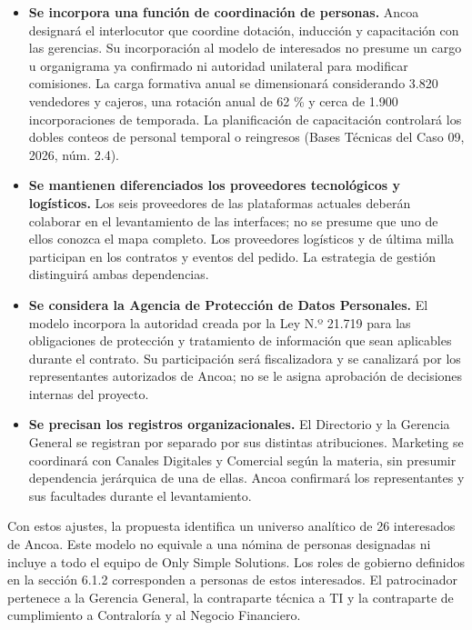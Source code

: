 \documentclass[11pt]{article}
\begin{document}
\begin{itemize}
\item
  \textbf{Se incorpora una función de coordinación de personas.} Ancoa
  designará el interlocutor que coordine dotación, inducción y
  capacitación con las gerencias. Su incorporación al modelo de
  interesados no presume un cargo u organigrama ya confirmado ni
  autoridad unilateral para modificar comisiones. La carga formativa
  anual se dimensionará considerando 3.820 vendedores y cajeros, una
  rotación anual de 62 \% y cerca de 1.900 incorporaciones de temporada.
  La planificación de capacitación controlará los dobles conteos de
  personal temporal o reingresos (Bases Técnicas del Caso 09, 2026,
  núm. 2.4).
\item
  \textbf{Se mantienen diferenciados los proveedores tecnológicos y
  logísticos.} Los seis proveedores de las plataformas actuales deberán
  colaborar en el levantamiento de las interfaces; no se presume que uno
  de ellos conozca el mapa completo. Los proveedores logísticos y de
  última milla participan en los contratos y eventos del pedido. La
  estrategia de gestión distinguirá ambas dependencias.
\item
  \textbf{Se considera la Agencia de Protección de Datos Personales.} El
  modelo incorpora la autoridad creada por la Ley N.º 21.719 para las
  obligaciones de protección y tratamiento de información que sean
  aplicables durante el contrato. Su participación será fiscalizadora y
  se canalizará por los representantes autorizados de Ancoa; no se le
  asigna aprobación de decisiones internas del proyecto.
\item
  \textbf{Se precisan los registros organizacionales.} El Directorio y
  la Gerencia General se registran por separado por sus distintas
  atribuciones. Marketing se coordinará con Canales Digitales y
  Comercial según la materia, sin presumir dependencia jerárquica de una
  de ellas. Ancoa confirmará los representantes y sus facultades durante
  el levantamiento.
\end{itemize}

Con estos ajustes, la propuesta identifica un universo analítico de 26
interesados de Ancoa. Este modelo no equivale a una nómina de personas
designadas ni incluye a todo el equipo de Only Simple Solutions. Los
roles de gobierno definidos en la sección 6.1.2 corresponden a personas
de estos interesados. El patrocinador pertenece a la Gerencia General,
la contraparte técnica a TI y la contraparte de cumplimiento a
Contraloría y al Negocio Financiero.
\end{document}
